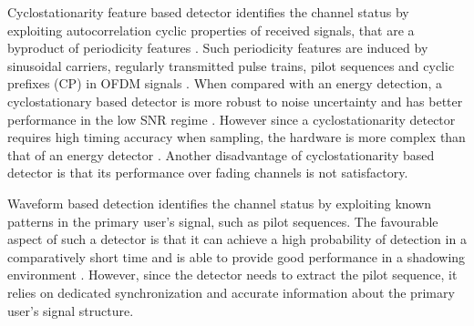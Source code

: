Cyclostationarity feature based detector identifies the channel status by exploiting autocorrelation cyclic properties of received signals, that are a byproduct of periodicity features \cite{goldsmith2009breaking}. Such periodicity features are induced by  sinusoidal carriers,  regularly transmitted pulse trains, pilot sequences and cyclic prefixes (CP) in OFDM signals \cite{akyildiz2011cooperative, umar2013comparative}.  
When compared with an energy detection, a cyclostationary based detector is more robust to noise uncertainty and has better performance in the low SNR regime \cite{umar2013comparative}. However since a cyclostationarity detector requires high timing accuracy when sampling, the hardware is more complex than that of an energy detector \cite{yucek2009survey}. Another disadvantage of cyclostationarity based detector is that its performance over fading channels is not satisfactory\cite{tandra2007snr}.   

Waveform based detection identifies the channel status by exploiting known patterns in the primary user's signal, such as pilot sequences. The favourable aspect of such a detector is that it can achieve a high probability of detection in a comparatively short time and is able to provide  good performance in a shadowing environment \cite{tang2005some}. However, since the detector needs to extract the pilot sequence, it relies on dedicated synchronization and accurate information about the primary user's signal structure.  




